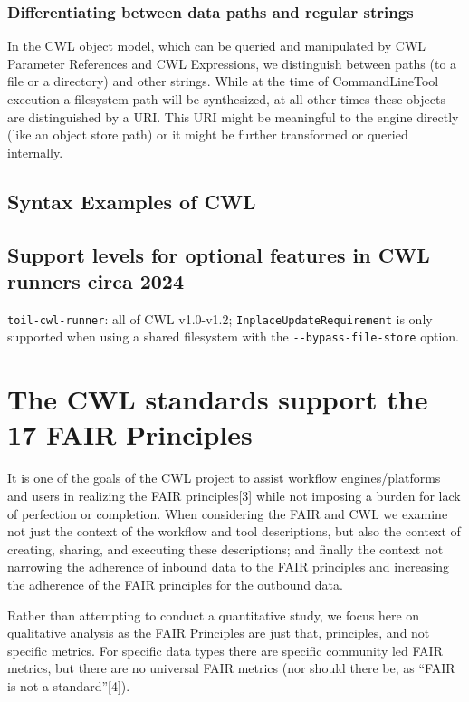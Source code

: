 \subsubsection{Differentiating between data paths and regular strings}
In the CWL object model, which can be queried and manipulated by CWL Parameter References and CWL Expressions, we distinguish between paths (to a file or a directory) and other strings.
While at the time of CommandLineTool execution a filesystem path will be synthesized, at all other times these objects are distinguished by a URI.
This URI might be meaningful to the engine directly (like an object store path) or it might be further transformed or queried internally.

\subsection{Syntax Examples of CWL}

\subsection{Support levels for optional features in CWL runners circa 2024}
\verb|toil-cwl-runner|: all of CWL v1.0-v1.2; \verb|InplaceUpdateRequirement| is only supported when using a shared filesystem with the \verb|--bypass-file-store| option.


\section{The CWL standards support the 17 FAIR Principles}
It is one of the goals of the CWL project to assist workflow engines/platforms and users in realizing the FAIR principles[3] while not imposing a burden for lack of perfection or completion. When considering the FAIR and CWL we examine not just the context of the workflow and tool descriptions, but also the context of creating, sharing, and executing these descriptions; and finally the context not narrowing the adherence of inbound data to the FAIR principles and increasing the adherence of the FAIR principles for the outbound data.

Rather than attempting to conduct a quantitative study, we focus here on qualitative analysis as the FAIR Principles are just that, principles, and not specific metrics. For specific data types there are specific community led FAIR metrics, but there are no universal FAIR metrics (nor should there be, as “FAIR is not a standard”[4]).
